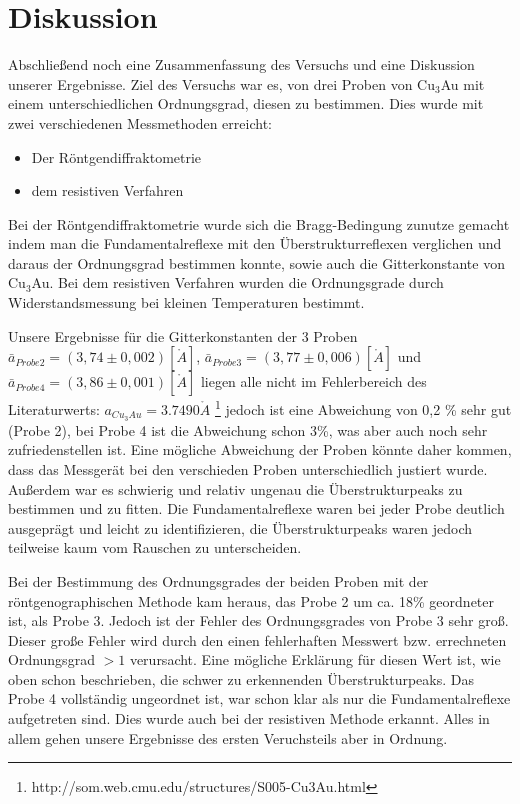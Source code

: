 \section{Diskussion}
    Abschließend noch eine Zusammenfassung des Versuchs und eine Diskussion
    unserer Ergebnisse.
    Ziel des Versuchs war es, von drei Proben von Cu$_3$Au mit einem
    unterschiedlichen Ordnungsgrad, diesen zu bestimmen. 
    Dies wurde mit zwei verschiedenen Messmethoden erreicht: 
    \begin{itemize}
        \item Der Röntgendiffraktometrie
        \item dem resistiven Verfahren
    \end{itemize}
    Bei der Röntgendiffraktometrie wurde sich die Bragg-Bedingung zunutze gemacht
    indem man die Fundamentalreflexe mit den Überstrukturreflexen verglichen und 
    daraus der Ordnungsgrad bestimmen konnte, sowie auch die Gitterkonstante
    von Cu$_3$Au. Bei dem resistiven Verfahren wurden die Ordnungsgrade 
    durch Widerstandsmessung bei kleinen Temperaturen bestimmt.

    Unsere Ergebnisse für die Gitterkonstanten der 3 Proben $\bar{a}_{Probe2} = (3,74 \pm 0,002)[\mathring{A}]$,
    $\bar{a}_{Probe3} = (3,77 \pm 0,006)[\mathring{A}]$ und $\bar{a}_{Probe4} = (3,86 \pm 0,001)[\mathring{A}]$ liegen
    alle nicht im Fehlerbereich des Literaturwerts: $a_{Cu_3Au} = 3.7490\mathring{A}$ \footnote{http://som.web.cmu.edu/structures/S005-Cu3Au.html}
    jedoch ist eine Abweichung von 0,2 \% sehr gut (Probe 2), bei Probe 4 ist die Abweichung schon 3\%, was aber 
    auch noch sehr zufriedenstellen ist. Eine mögliche Abweichung der Proben könnte daher kommen, dass das Messgerät bei den verschieden Proben
    unterschiedlich justiert wurde. Außerdem war es schwierig und relativ ungenau die Überstrukturpeaks zu bestimmen und zu fitten.
    Die Fundamentalreflexe waren bei jeder Probe deutlich ausgeprägt und leicht zu identifizieren, die Überstrukturpeaks 
    waren jedoch teilweise kaum vom Rauschen zu unterscheiden.
    
    Bei der Bestimmung des Ordnungsgrades der beiden Proben mit der röntgenographischen Methode kam heraus, 
    das Probe 2 um ca. 18\% geordneter ist, als Probe 3. Jedoch ist der Fehler des Ordnungsgrades von Probe 3 sehr groß.
    Dieser große Fehler wird durch den einen fehlerhaften Messwert bzw. errechneten Ordnungsgrad $>1$ verursacht.
    Eine mögliche Erklärung für diesen Wert ist, wie oben schon beschrieben, die schwer zu erkennenden Überstrukturpeaks.
    Das Probe 4 vollständig ungeordnet ist, war schon klar als nur die Fundamentalreflexe aufgetreten sind. Dies wurde
    auch bei der resistiven Methode erkannt. Alles in allem gehen unsere Ergebnisse des ersten Veruchsteils
    aber in Ordnung.

